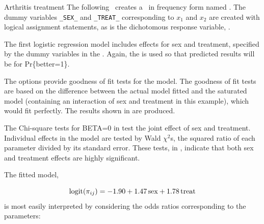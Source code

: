 \begin{Example}[arthrit8]{Arthritis treatment}
The following \Dstp\ creates a \Dset\ in frequency form
named .  The dummy variables \verb|_SEX_| and \verb|_TREAT_|
corresponding to \(x_1\) and \(x_2\) are created with logical assignment
statements, 
as is the
dichotomous response variable, .

The first logistic regression model includes effects for sex and
treatment, specified by the dummy variables in the .
Again,
the  is used
so that predicted results will be for
Pr\{better=1\}.

The options  provide goodness of fit tests%
for the model.  The goodness of fit tests are based on the difference
between the actual model fitted and the saturated model (containing
an interaction of sex and treatment in this example), which would fit
perfectly.  The results shown in  are produced.
\begin{Output}[htb]
\caption{Arthritis treatment data: Overall tests}\label{out:glogist0.1}
\small

\end{Output}
The Chi-square tests for BETA=0 in  test the joint effect of sex
and treatment.  Individual effects in the model are tested by Wald
\(\chi^2\)s, the squared ratio of each parameter divided by its
standard error.  These tests, in , indicate that both sex and
treatment effects are highly significant.

\begin{Output}[htb]
\caption{Arthritis treatment data: Parameter estimates}\label{out:glogist0.2}
\small

\end{Output}
The fitted model,

\begin{equation} \label{eq:fitmod}
  \logit ( \pi_{ij} ) = -1.90  +  1.47 \, \mbox{sex}
  +  1.78 \, \mbox{treat}
\end{equation}
is most easily interpreted by considering the odds ratios
corresponding to the parameters:


\end{Example}
